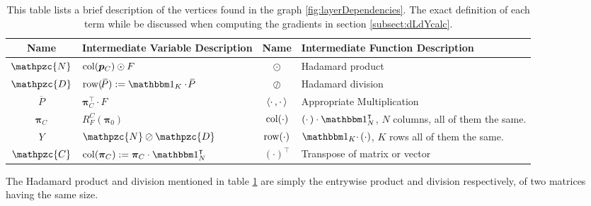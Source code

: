 \begin{table}[h]
	\centering
	\begin{tabular}{|c|m{}||c|m{}|}
		\toprule
		 Name & Intermediate Variable Description & Name & Intermediate Function Description\\
		\midrule
		\( \mathpzc{N} \) & \( \operatorname{col}(\bm p_C)\odot F \) & \( \odot \) & Hadamard product \\
		\midrule
		\( \mathpzc{D} \) & \(  \op{row}(\overbar{\!P}):=\mathbbm 1_K\cdot \overbar{\!P} \) & \( \oslash \) & Hadamard division\\ \midrule
		\( \overbar{\!P} \) & \( \bm\pi_C^{\intercal}\cdot F \) & \( \langle\cdotp,\cdotp\rangle \) & Appropriate Multiplication\\ \midrule
		\( \bm \pi_C \) & \( R_F^C(\bm\pi_0) \) & \( \operatorname{col}(\cdot) \) & \( (\cdotp)\cdot\mathbbm 1_N^{\intercal} \), \( N\) columns, all of them the same.\\ \midrule
		\( Y \) & \( \mathpzc{N}\oslash \mathpzc{D} \) & \( \operatorname{row}(\cdot) \) & \( \mathbbm 1_K\cdotp(\cdot) \), \( K \) rows all of them the same.\\ \midrule
		\(\mathpzc{C}\)&\( \op{col}(\bm\pi_C):=\bm\pi_C\cdot\mathbbm 1_N^{\intercal} \)&\( (\cdotp)^{\intercal} \) & Transpose of matrix or vector \\
		\bottomrule
	\end{tabular}
\caption[Intermediate Terms for Computation of \( \pdv*{Y}{F} \)]{This table lists a brief description of  the vertices found in the graph \ref{fig:layerDependencies}. The exact definition of each term while be discussed when computing the gradients in section \ref{subsect:dLdYcalc}.}\label{table:vertexDesc}
\end{table}

The Hadamard product and division mentioned in table \ref{table:vertexDesc} are simply the entrywise product and division respectively, of two matrices having the same size.
